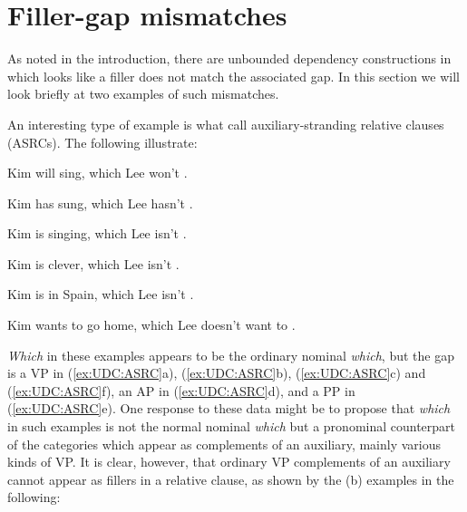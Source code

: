 \documentclass[output=paper
                ,modfonts
                ,nonflat
	        ,collection
	        ,collectionchapter
	        ,collectiontoclongg
 	        ,biblatex
                ,babelshorthands
                ,newtxmath
                ,draftmode
                ,colorlinks, citecolor=brown
]{./langsci/langscibook}
\begin{document}
{%


\section{Filler-gap mismatches}
\label{sec:UDC:FillerGapMismatches}

As noted in the introduction, there are unbounded dependency
constructions in which looks like a filler does not match the associated
gap. In this section we will look briefly at two examples of such
mismatches.

An interesting type of example is what \citet{Arnold:Borsley:10} call
auxiliary-stranding relative clauses (ASRCs). The following
illustrate:

\begin{exe}
  \ex \label{ex:UDC:ASRC}
  \begin{xlist}
    \ex Kim will sing, which Lee won't \gap{}.
    
    \ex Kim has sung, which Lee hasn't \gap{}.
    
    \ex Kim is singing, which Lee isn't \gap{}.
    
    \ex Kim is clever, which Lee isn't \gap{}.
    
    \ex Kim is in Spain, which Lee isn't \gap{}.
    
    \ex Kim wants to go home, which Lee doesn't want to \gap{}.
  \end{xlist}
\end{exe}

\noindent
\emph{Which} in these examples appears to be the ordinary nominal
\emph{which}, but the gap is a VP in (\ref{ex:UDC:ASRC}a), (\ref{ex:UDC:ASRC}b), (\ref{ex:UDC:ASRC}c) and (\ref{ex:UDC:ASRC}f), an AP in
(\ref{ex:UDC:ASRC}d), and a PP in (\ref{ex:UDC:ASRC}e). One response to these data might be to propose
that \emph{which} in such examples is not the normal nominal
\emph{which} but a pronominal counterpart of the categories which appear
as complements of an auxiliary, mainly various kinds of VP. It is clear,
however, that ordinary VP complements of an auxiliary cannot appear as
fillers in a relative clause, as shown by the (b) examples in the
following:

\begin{exe} \ex \begin{xlist} 

\end{xlist}
\end{exe}

}
\end{document}
